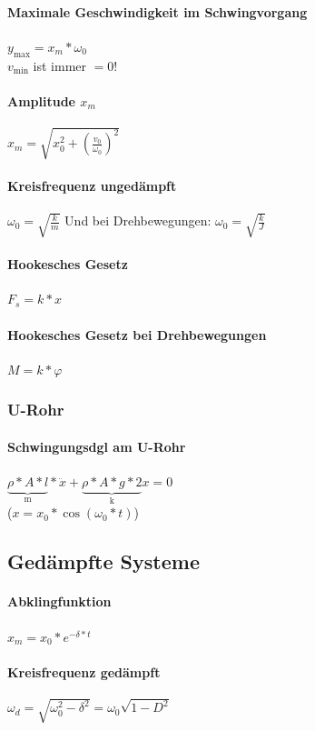 \documentclass[12pt, a4paper]{scrreprt}
\begin{document}
\paragraph{Maximale Geschwindigkeit im Schwingvorgang} \dotfill \(y_{\max} = x_m * \omega _0\)\\
\myhspace \textcolor{myred}{\(v_{\min}\) ist immer \(= 0\)!}
\paragraph{Amplitude \(x_m\)} \dotfill \(x_m = \sqrt{x_0^2 + {\left( \frac{v_0}{\omega _0} \right)}^2}\)
\paragraph{Kreisfrequenz ungedämpft} \dotfill \(\omega_0=\sqrt{\frac{k}{m}}\) Und bei Drehbewegungen: \(\omega_0=\sqrt{\frac{k}{J}}\)
\paragraph{Hookesches Gesetz} \dotfill \(F_s=k*x\)
\paragraph{Hookesches Gesetz bei Drehbewegungen} \dotfill \(M = k * \varphi\)

\subsubsection{U-Rohr}
\paragraph{Schwingungsdgl am U-Rohr} \dotfill \(\underbrace{\rho*A*l}_\text{m}*\ddot x+\underbrace{\rho*A*g*2}_\text{k}x=0\)\\
(\(x=x_0*\cos(\omega_0*t)\))


\subsection{Gedämpfte Systeme}

\paragraph{Abklingfunktion} \dotfill \(x_m=x_0*e^{-\delta*t}\)
\paragraph{Kreisfrequenz gedämpft} \dotfill \(\omega_d=\sqrt{\omega_0^2-\delta^2}=\omega_0\sqrt{1-D^2}\)
\end{document}
